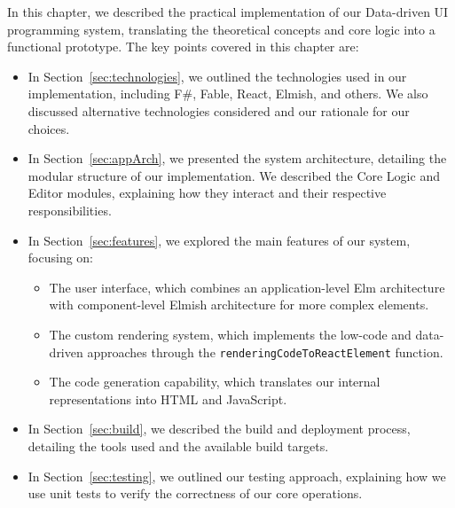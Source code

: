 In this chapter, we described the practical implementation of our Data-driven UI programming system,
translating the theoretical concepts and core logic into a functional prototype.
The key points covered in this chapter are:

\begin{itemize}
	\item In Section~\ref{sec:technologies}, we outlined the technologies used in our implementation, including F\#, Fable, React, Elmish, and others.
	      We also discussed alternative technologies considered and our rationale for our choices.

	\item In Section~\ref{sec:appArch}, we presented the system architecture,
	      detailing the modular structure of our implementation.
	      We described the Core Logic and Editor modules, explaining how they interact and their respective responsibilities.

	\item In Section~\ref{sec:features}, we explored the main features of our system, focusing on:
	      \begin{itemize}
		      \item The user interface, which combines an application-level Elm architecture with component-level Elmish architecture for more complex elements.
		      \item The custom rendering system, which implements the low-code and data-driven approaches through the \texttt{renderingCodeToReactElement} function.
		      \item The code generation capability, which translates our internal representations into HTML and JavaScript.
	      \end{itemize}

	\item In Section~\ref{sec:build}, we described the build and deployment process, detailing the tools used and the available build targets.

	\item In Section~\ref{sec:testing}, we outlined our testing approach, explaining how we use unit tests to verify the correctness of our core operations.
\end{itemize}






